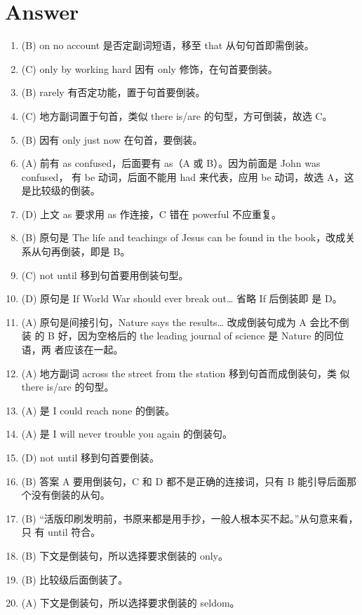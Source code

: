 \section{Answer}
\begin{enumerate}
\item (B) on no account 是否定副词短语，移至 that 从句句首即需倒装。

\item (C) only by working hard 因有 only 修饰，在句首要倒装。

\item (B) rarely 有否定功能，置于句首要倒装。

\item (C) 地方副词置于句首，类似 there is/are 的句型，方可倒装，故选 C。

\item (B) 因有 only just now 在句首，要倒装。

\item (A) 前有 as confused，后面要有 as（A 或 B）。因为前面是 John was confused，
  有 be 动词，后面不能用 had 来代表，应用 be 动词，故选 A，这是比较级的倒装。

\item (D) 上文 as 要求用 as 作连接，C 错在 powerful 不应重复。

\item (B) 原句是 The life and teachings of Jesus can be found in the book，改成关系从句再倒装，即是 B。


\item (C) not until 移到句首要用倒装句型。
\item (D) 原句是 If World War  should ever break out… 省略 If 后倒装即
  是 D。

\item (A) 原句是间接引句，Nature says the results… 改成倒装句成为 A 会比不倒装
  的 B 好，因为空格后的 the leading journal of science 是 Nature 的同位语，两
  者应该在一起。

\item (A) 地方副词 across the street from the station 移到句首而成倒装句，类
  似 there is/are 的句型。

\item (A) 是 I could reach none 的倒装。

\item (A) 是 I will never trouble you again 的倒装句。

\item (D) not until 移到句首要倒装。

\item (B) 答案 A 要用倒装句，C 和 D 都不是正确的连接词，只有 B 能引导后面那个没有倒装的从句。

\item (B) “活版印刷发明前，书原来都是用手抄，一般人根本买不起。”从句意来看，只
  有 until 符合。

\item (B) 下文是倒装句，所以选择要求倒装的 only。

\item (B) 比较级后面倒装了。

\item (A) 下文是倒装句，所以选择要求倒装的 seldom。
\end{enumerate}
